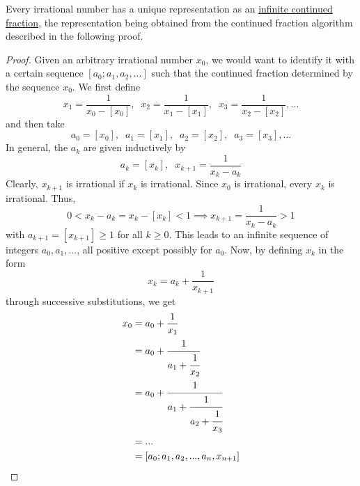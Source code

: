\documentclass{article}
\newcounter{theorem}[section]
\begin{document}
\begin{theorem}
  \label{thm:irrational-number-unique-representation-infinite}
Every irrational number has a unique representation as an \hyperref[def:infinite-continued-fraction]{infinite continued fraction}, the representation being obtained from the continued fraction algorithm described in the following proof. 
\end{theorem}
\begin{proof} Given an arbitrary irrational number $x_0$, we would want to identify it with a certain sequence $[a_0; a_1, a_2, ...]$ such that the continued fraction determined by the sequence $x_0$. We first define 
\begin{equation}
  x_1 = \frac{1}{x_0 - [x_0]}, \;\; x_2 = \frac{1}{x_1 - [x_1]}, \;\; x_3 = \frac{1}{x_2 - [x_2]}, ...
\end{equation}
and then take 
\begin{equation}
  a_0 = [x_0], \;\; a_1 = [x_1], \;\; a_2 = [x_2], \;\; a_3 = [x_3], ...
\end{equation}
In general, the $a_k$ are given inductively by
\begin{equation}
  a_k = [x_k], \;\; x_{k+1} = \frac{1}{x_k - a_k}
\end{equation}
Clearly, $x_{k+1}$ is irrational if $x_k$ is irrational. Since $x_0$ is irrational, every $x_k$ is irrational. Thus, 
\begin{equation}
  0 < x_k  - a_k = x_k - [x_k] < 1 \implies x_{k+1} = \frac{1}{x_k - a_k} > 1
\end{equation}
with $a_{k+1} = [x_{k+1}] \geq 1$ for all $k \geq 0$. This leads to an infinite sequence of integers $a_0, a_1, ...$, all positive except possibly for $a_0$. Now, by defining $x_k$ in the form 
\begin{equation}
  x_k = a_k + \frac{1}{x_{k+1}}
\end{equation}
through successive substitutions, we get
\begin{align*}
    x_0 & = a_0 + \frac{1}{x_1} \\ 
    & = a_0 + \cfrac{1}{a_1 + \cfrac{1}{x_2}} \\
    & = a_0 + \cfrac{1}{a_1 + \cfrac{1}{a_2 + \cfrac{1}{x_3}}} \\
    & = ... \\
    & = [a_0 ; a_1, a_2, ..., a_n, x_{n+1}]
\end{align*}
\end{proof}
\end{document}
